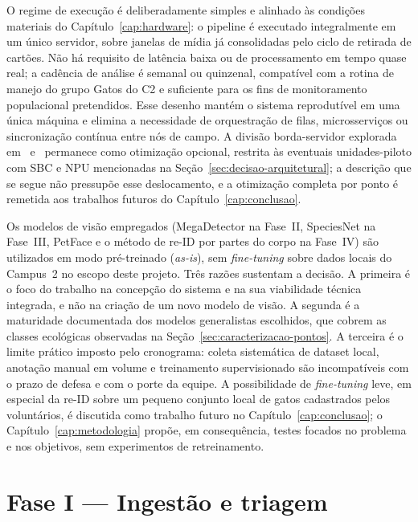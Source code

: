 O regime de execução é deliberadamente simples e alinhado às condições materiais do Capítulo~\ref{cap:hardware}: o pipeline é executado integralmente em um único servidor, sobre janelas de mídia já consolidadas pelo ciclo de retirada de cartões. Não há requisito de latência baixa ou de processamento em tempo quase real; a cadência de análise é semanal ou quinzenal, compatível com a rotina de manejo do grupo Gatos do C2 e suficiente para os fins de monitoramento populacional pretendidos. Esse desenho mantém o sistema reprodutível em uma única máquina e elimina a necessidade de orquestração de filas, microsserviços ou sincronização contínua entre nós de campo. A divisão borda-servidor explorada em~ e~ permanece como otimização opcional, restrita às eventuais unidades-piloto com SBC e NPU mencionadas na Seção~\ref{sec:decisao-arquitetural}; a descrição que se segue não pressupõe esse deslocamento, e a otimização completa por ponto é remetida aos trabalhos futuros do Capítulo~\ref{cap:conclusao}.

Os modelos de visão empregados (MegaDetector na Fase~II, SpeciesNet na Fase~III, PetFace e o método de re-ID por partes do corpo na Fase~IV) são utilizados em modo pré-treinado (\textit{as-is}), sem \textit{fine-tuning} sobre dados locais do Campus~2 no escopo deste projeto. Três razões sustentam a decisão. A primeira é o foco do trabalho na concepção do sistema e na sua viabilidade técnica integrada, e não na criação de um novo modelo de visão. A segunda é a maturidade documentada dos modelos generalistas escolhidos, que cobrem as classes ecológicas observadas na Seção~\ref{sec:caracterizacao-pontos}. A terceira é o limite prático imposto pelo cronograma: coleta sistemática de dataset local, anotação manual em volume e treinamento supervisionado são incompatíveis com o prazo de defesa e com o porte da equipe. A possibilidade de \textit{fine-tuning} leve, em especial da re-ID sobre um pequeno conjunto local de gatos cadastrados pelos voluntários, é discutida como trabalho futuro no Capítulo~\ref{cap:conclusao}; o Capítulo~\ref{cap:metodologia} propõe, em consequência, testes focados no problema e nos objetivos, sem experimentos de retreinamento.

\section{Fase I --- Ingestão e triagem}
\label{sec:pipeline-fase1}

